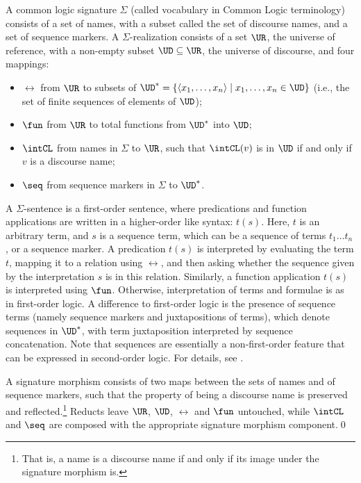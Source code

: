 \documentclass[10pt, a4paper]{isov2}
\begin{document}
\begin{definition}\label{sem:CommonLogic}
A common logic signature
$\Sigma$ (called vocabulary in Common Logic terminology) consists of a
set of names, with a subset called the set of discourse names, and a
set of sequence markers.
A $\Sigma$-realization consists of a set $\UR$,
the universe of reference, with a non-empty subset $\UD\subseteq \UR$,
the universe of discourse, and four mappings:
  \begin{itemize}
   \item $\rel$ from $\UR$ to subsets of $\UD^* = \{\langle x_1,\ldots,x_n \rangle \mid x_1,\ldots,x_n \in \UD\}$ (i.e., the set of finite sequences of
elements of $\UD$);
   \item $\fun$ from $\UR$ to total functions from $\UD^*$ into $\UD$;
   \item $\intCL$ from names in $\Sigma$ to $\UR$, such that
$\intCL(v)$ is in $\UD$ if and only if $v$ is a discourse name;
   \item $\seq$ from sequence markers in $\Sigma$ to $\UD^*$.
  \end{itemize}  A $\Sigma$-sentence is a first-order
sentence, where predications and function applications are written
in a higher-order like syntax: $t(s)$.
Here, $t$ is an arbitrary term, and $s$ is a sequence term, which can
be a sequence of terms $t_1\ldots t_n$, or a sequence marker.
A predication $t(s)$ is interpreted by evaluating the term $t$,
mapping it to a relation using $\rel$, and then asking whether the sequence
given by the interpretation $s$ is in this relation.
Similarly, a function application $t(s)$ is interpreted using $\fun$.
Otherwise, interpretation of terms and formulae is as in
first-order logic.
A
difference to first-order logic is the presence of sequence terms (namely sequence markers and
juxtapositions of terms), which denote sequences in $\UD^*$, with term
juxtaposition interpreted by sequence concatenation.
Note that sequences are essentially a non-first-order feature that
can be expressed in second-order logic.
For details, see \cite{CommonLogic:oldfashioned}.

A \Clogic signature morphism
consists of two maps between the sets of names and of sequence markers, such that the property of
being a discourse name is preserved and reflected.\footnote{That  is, a name is a discourse
name if and only if its image under the signature morphism is.}
  Reducts leave $\UR$, $\UD$,
$\rel$ and $\fun$ untouched, while $\intCL$ and $\seq$ are composed with the appropriate
signature morphism component.\quad\qed
\end{definition}
%
\end{document}
